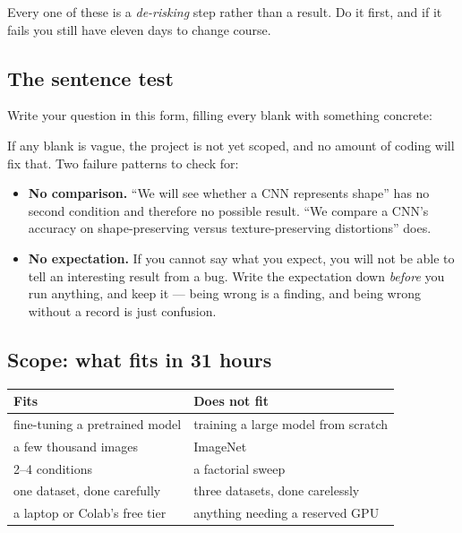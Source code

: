 \documentclass[11pt]{article}
\begin{document}
Every one of these is a \emph{de-risking} step rather than a result. Do it first,
and if it fails you still have eleven days to change course.

\subsection{The sentence test}

Write your question in this form, filling every blank with something concrete:

\begin{keybox}
\end{keybox}

If any blank is vague, the project is not yet scoped, and no amount of coding
will fix that. Two failure patterns to check for:

\begin{itemize}
  \item \textbf{No comparison.} ``We will see whether a CNN represents shape'' has
        no second condition and therefore no possible result. ``We compare a
        CNN's accuracy on shape-preserving versus texture-preserving distortions''
        does.
  \item \textbf{No expectation.} If you cannot say what you expect, you will not
        be able to tell an interesting result from a bug. Write the expectation
        down \emph{before} you run anything, and keep it --- being wrong is a
        finding, and being wrong without a record is just confusion.
\end{itemize}

\subsection{Scope: what fits in 31 hours}

\begin{center}
\begin{tabular}{@{}ll@{}}
\toprule
Fits & Does not fit \\
\midrule
fine-tuning a pretrained model & training a large model from scratch \\
a few thousand images & ImageNet \\
2--4 conditions & a factorial sweep \\
one dataset, done carefully & three datasets, done carelessly \\
a laptop or Colab's free tier & anything needing a reserved GPU \\
\bottomrule
\end{tabular}
\end{center}
\end{document}
